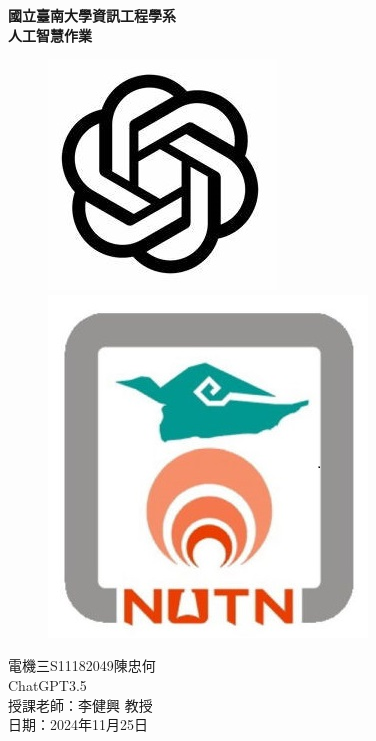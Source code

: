 \setmainfont{Times New Roman}  %
\begin{titlepage}
    \centering
    {\Huge \textbf{國立臺南大學資訊工程學系\\人工智慧作業}}\\[2cm] %
    \begin{figure}[htbp]
        \centering
        \includegraphics[width=0.3\linewidth]{images/chatgpt.jpg} 
        \hspace{2cm}
        \includegraphics[width=0.3\linewidth]{images/NUTN_LOGO.jpg}
    \end{figure} 
    \vspace{2cm}
    {\Large 電機三\hspace{1em}S11182049\hspace{1em}陳忠何}\\[0.5cm] 
    {\Large ChatGPT3.5}\\[0.5cm]
    \vfill
    {\Large 授課老師：李健興 教授}\\[1cm] %
    {\Large 日期：2024年11月25日}\\[2cm] %
\end{titlepage} 